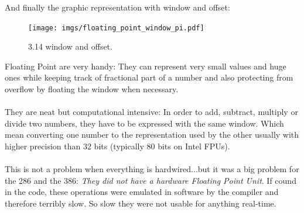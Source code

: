 \documentclass[book.tex]{subfiles}
\begin{document}
\bigskip

And finally the graphic representation with window and offset:\\

\begin{figure}[H]
\centering
\texttt{[image: imgs/floating\_point\_window\_pi.pdf]}

\caption{3.14 window and offset.}
\label{fig:fp_internals}
\end{figure}
  \bigskip

Floating Point are very handy: They can represent very small values and huge ones while keeping track of fractional part of a number and also protecting from overflow by floating the window when necessary.\\
\\
They are neat but computational intensive: In order to add, subtract, multiply or divide two numbers, they have to be expressed with the same window. Which mean converting one number to the representation used by the other usually with higher precision than 32 bits (typically 80 bits on Intel FPUs).\\
\\
This is not a problem when everything is hardwired...but it was a big problem for the 286 and the 386: \emph{They did not have a hardware Floating Point Unit}. If cound in the code, these operations were emulated in software by the compiler and therefore terribly slow. So slow they were not usable for anything real-time. 

  \bigskip
\end{document}
